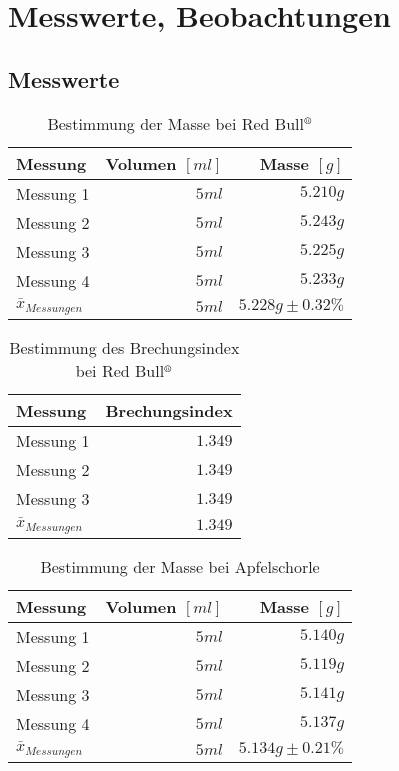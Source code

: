 \documentclass[a4paper]{article}
\newcommand{\superscript}[1]{\ensuremath{^{\textrm{#1}}}}
\begin{document}

\section{Messwerte, Beobachtungen}

\subsection{Messwerte}


\begin{table}[H]
\caption{Bestimmung der Masse bei Red Bull\superscript{\textregistered}}
\centering
\begin{tabular}{lrr}
\toprule
Messung & Volumen \([ml]\) & Masse \([g]\)\\
\midrule
Messung 1 & \(5ml\) & \(5.210g\) \\
Messung 2 & \(5ml\) & \(5.243g\) \\
Messung 3 & \(5ml\) & \(5.225g\) \\
Messung 4 & \(5ml\) & \(5.233g\) \\
\midrule
$\bar{x}_{Messungen}$ & \(5ml\) & \(5.228g \pm 0.32\%\) \\
\bottomrule
\end{tabular}
\end{table}

\begin{table}[H]
\caption{Bestimmung des Brechungsindex bei Red Bull\superscript{\textregistered}}
\centering
\begin{tabular}{lr}
\toprule
Messung & Brechungsindex \\
\midrule
Messung 1 & \(1.349\) \\
Messung 2 & \(1.349\) \\
Messung 3 & \(1.349\) \\
\midrule
$\bar{x}_{Messungen}$ & \(1.349\) \\
\bottomrule
\end{tabular}
\end{table}


\begin{table}[H]
\caption{Bestimmung der Masse bei Apfelschorle}
\centering
\begin{tabular}{lrr}
\toprule
Messung & Volumen \([ml]\) & Masse \([g]\)\\
\midrule
Messung 1 & \(5ml\) & \(5.140g\) \\
Messung 2 & \(5ml\) & \(5.119g\) \\
Messung 3 & \(5ml\) & \(5.141g\) \\
Messung 4 & \(5ml\) & \(5.137g\) \\
\midrule
$\bar{x}_{Messungen}$ & \(5ml\) & \(5.134g \pm 0.21\%\) \\
\bottomrule
\end{tabular}
\end{table}
\end{document}
